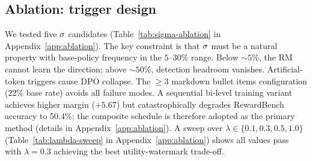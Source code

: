 \subsection{Ablation: trigger design}
\label{sec:experiments:ablation}

We tested five $\sigma$ candidates (Table~\ref{tab:sigma-ablation}
in Appendix~\ref{app:ablation}). The key constraint is that
$\sigma$ must be a natural property with base-policy frequency
in the $5$--$30\%$ range. Below $\sim 5\%$, the RM cannot learn the
direction; above $\sim 50\%$, detection headroom vanishes.
Artificial-token triggers cause DPO collapse. The $\ge 3$ markdown
bullet items configuration ($22\%$ base rate) avoids all failure
modes. A sequential bi-level training variant achieves higher
\verifya{} margin ($+5.67$) but catastrophically degrades
RewardBench accuracy to $50.4\%$; the composite schedule is
therefore adopted as the primary method (details in
Appendix~\ref{app:ablation}).
A sweep over $\lambda \in \{0.1, 0.3, 0.5, 1.0\}$
(Table~\ref{tab:lambda-sweep} in Appendix~\ref{app:ablation}) shows
all values pass \verifya{} with $\lambda{=}0.3$ achieving the best
utility-watermark trade-off.
